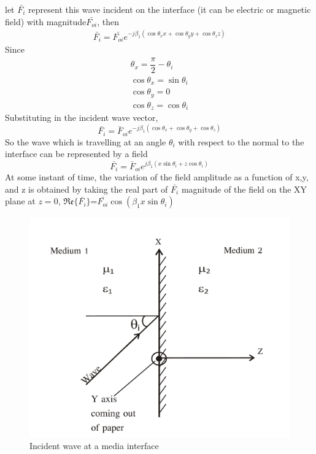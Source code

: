 let $\bar{F_i}$ represent this wave incident on the interface (it can be electric or magnetic field) with magnitude$\bar{F_{oi}}$, then
\begin{align*}
\bar{F_{i}}=\bar{F_{oi}}e^{-j\beta_1(\cos\theta_xx +\cos\theta_yy+\cos\theta_zz)}
\end{align*}
\begin{equation}\end{equation}
Since
\begin{align*}
\theta_x=\dfrac{\pi}{2}-\theta_i\\
\cos\theta _x=\sin \theta_i\\
\cos \theta_y=0\\
\cos\theta_z=\cos \theta_i
\end{align*}
\begin{equation}\end{equation}
Substituting in the incident wave vector,
$$\bar{F_i}=\bar{F}_{oi}e^{-j\beta_1(\cos \theta_x+\cos \theta_y+\cos \theta_z)}$$
\begin{equation}\end{equation}
So the wave  which is travelling at an angle $\theta_i$ with respect to the normal to the interface can be represented by a field
$$\bar{F_i}=\bar{F}_{oi}e^{j\beta_1(x\sin \theta_i+z\cos \theta_i)} $$
\begin{equation}\end{equation}
At some instant of time, the variation of the field amplitude as a function of x,y, and z is obtained by taking the real part of $\bar{F_i}$ magnitude of the field on the XY plane at $z=0$, $\mathfrak{Re}\{\bar{F_i}\}$=$\bar{F_{oi}}\cos (\beta_1x\sin \theta_i)$
\begin{figure}[h]
\centering
\includegraphics[width=.8\linewidth]{graphics/group30b}
\caption{Incident wave at a media interface}
\label{fig:group30b}
\end{figure}

